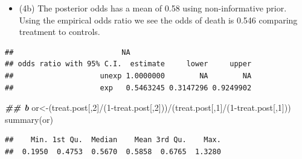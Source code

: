 \documentclass[
]{book}
\newenvironment{Shaded}{\begin{snugshade}}{\end{snugshade}}
\newcommand{\AttributeTok}[1]{\textcolor[rgb]{0.77,0.63,0.00}{#1}}
\newcommand{\DecValTok}[1]{\textcolor[rgb]{0.00,0.00,0.81}{#1}}
\newcommand{\DocumentationTok}[1]{\textcolor[rgb]{0.56,0.35,0.01}{\textbf{\textit{#1}}}}
\newcommand{\FunctionTok}[1]{\textcolor[rgb]{0.00,0.00,0.00}{#1}}
\newcommand{\NormalTok}[1]{#1}
\newcommand{\OtherTok}[1]{\textcolor[rgb]{0.56,0.35,0.01}{#1}}
\newcommand{\SpecialCharTok}[1]{\textcolor[rgb]{0.00,0.00,0.00}{#1}}
\newcommand{\StringTok}[1]{\textcolor[rgb]{0.31,0.60,0.02}{#1}}
\providecommand{\tightlist}{%
  \setlength{\itemsep}{0pt}\setlength{\parskip}{0pt}}
\theoremstyle{definition}
\theoremstyle{definition}
\theoremstyle{definition}
\theoremstyle{definition}
\theoremstyle{remark}
\begin{document}
\begin{itemize}
\tightlist
\item
  (4b) The posterior odds has a mean of 0.58 using non-informative prior. Using the empirical odds ratio we see the odds of death is 0.546 comparing treatment to controls.
\end{itemize}

\begin{Shaded}
\end{Shaded}

\begin{verbatim}
##                         NA
## odds ratio with 95% C.I.  estimate     lower     upper
##                    unexp 1.0000000        NA        NA
##                    exp   0.5463245 0.3147296 0.9249902
\end{verbatim}

\begin{Shaded}
\begin{Highlighting}[]
  \DocumentationTok{\#\# b}
\NormalTok{  or}\OtherTok{\textless{}{-}}\NormalTok{(treat.post[,}\DecValTok{2}\NormalTok{]}\SpecialCharTok{/}\NormalTok{(}\DecValTok{1}\SpecialCharTok{{-}}\NormalTok{treat.post[,}\DecValTok{2}\NormalTok{]))}\SpecialCharTok{/}\NormalTok{(treat.post[,}\DecValTok{1}\NormalTok{]}\SpecialCharTok{/}\NormalTok{(}\DecValTok{1}\SpecialCharTok{{-}}\NormalTok{treat.post[,}\DecValTok{1}\NormalTok{]))}
\FunctionTok{summary}\NormalTok{(or)}
\end{Highlighting}
\end{Shaded}

\begin{verbatim}
##    Min. 1st Qu.  Median    Mean 3rd Qu.    Max. 
##  0.1950  0.4753  0.5670  0.5858  0.6765  1.3280
\end{verbatim}
\end{document}
